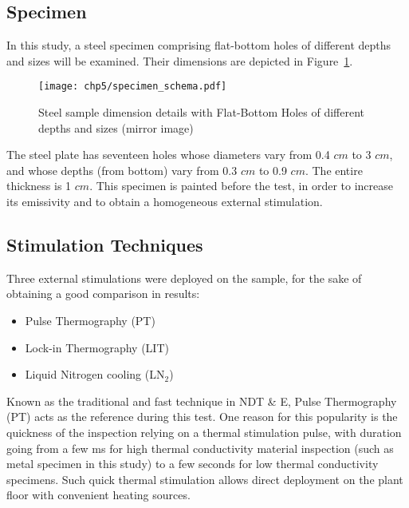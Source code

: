 \subsection{Specimen} %
\label{sub:specimen}
In this study, a steel specimen comprising flat-bottom holes of different depths and sizes will be examined. Their dimensions are depicted in Figure~\ref{specimen}.
   \begin{figure}[ht]
   \centering   
   \texttt{[image: chp5/specimen\_schema.pdf]}
   \caption{Steel sample dimension details with Flat-Bottom Holes of different depths and sizes (mirror image)} 
    \label{specimen} 
   \end{figure}  

The steel plate has seventeen holes whose diameters vary from 0.4 $cm$  to 3 $cm$, and whose depths (from bottom) vary from 0.3 $cm$ to 0.9 $cm$. The entire thickness is 1 $cm$. This specimen is painted before the test, in order to increase its emissivity and to obtain a homogeneous external stimulation.

\subsection{Stimulation Techniques} %
\label{sub:stimulation_techniques}
Three external stimulations were deployed on the sample, for the sake of  obtaining a good comparison in results: 
\begin{itemize}
   \item Pulse Thermography (PT) 
   \item Lock-in Thermography (LIT)
   \item Liquid Nitrogen cooling (LN$_2$)
\end{itemize}
Known as the traditional and fast technique in NDT \& E, Pulse Thermography (PT) acts as the reference during this test. One reason for this popularity is the quickness of the inspection relying on a thermal  stimulation pulse, with duration going from a few ms for high thermal conductivity material inspection (such as metal specimen in this study) to a few seconds for low thermal conductivity specimens.  Such quick thermal stimulation allows direct deployment on the plant floor with convenient heating sources.

